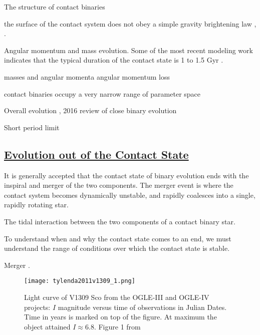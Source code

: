 \documentclass[12pt]{article} %
\numberwithin{equation}{section} %
\begin{document}
The structure of contact binaries \citep{kahler2004structure}

the surface of the contact system does not obey a simple gravity brightening law \citep{kahler2004structure}, \citep{hilditch1988evolutionary}.

\citep{rubenstein2001effect}

Angular momentum and mass evolution. Some of the most recent modeling work indicates that the typical duration of the contact state is 1 to 1.5 Gyr \citep{gazeas2008angular}.

masses and angular momenta \citep{gazeas2006masses} angular momentum loss \citep{vilhu1981contact}

contact binaries occupy a very narrow range of parameter space \citep{gazeas2009physical}

Overall evolution \citep{stepien2008evolutionary}, 2016 review of close binary evolution \citep{tutukov2016evolution}

Short period limit \citep{rucinski2007short} \citep{drake2014ultra} \cite{lohr2012period} \citep{rucinski1992can}


\subsection[Evolution out of the Contact State]{\hyperlink{toc}{Evolution out of the Contact State}}

It is generally accepted that the contact state of binary evolution ends with the inspiral and merger of the two components. The merger event is where the contact system becomes dynamically unstable, and rapidly coalesces into a single, rapidly rotating star. 

The tidal interaction between the two components of a contact binary star.

To understand when and why the contact state comes to an end, we must understand the range of conditions over which the contact state is stable.

Merger \citet{tylenda2011v1309}.

\begin{figure}[H]
\centering
\texttt{[image: tylenda2011v1309\_1.png]}
\caption{Light curve of V1309 Sco from the OGLE-III and OGLE-IV projects: $I$ magnitude versus time of observations in Julian Dates. Time in years is marked on top of the figure. At maximum the object attained $I \approx 6.8$. Figure 1 from \citet{tylenda2011v1309}}
\label{fig: tylenda2011v1309_1}
\end{figure}
\end{document}
